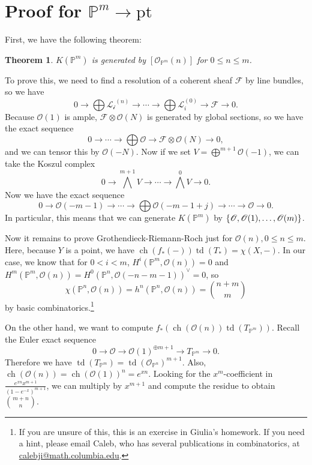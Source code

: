 \documentclass[leqno, openany]{memoir}
\newtheorem{thm}{Theorem}[section]
\theoremstyle{definition}
\theoremstyle{remark}
\theoremstyle{plain}
\theoremstyle{definition}
\theoremstyle{remark}
\renewcommand{\P}{\mathbb{P}}
\newcommand{\msc}[1]{\mathscr{#1}}
\newcommand{\mr}[1]{\mathrm{#1}}
\DeclareMathOperator{\ch}{ch}
\DeclareMathOperator{\td}{td}
\begin{document}
\section{Proof for $\P^m \to \mr{pt}$}%
\label{sec:proof_for_p_m_to_pt_}

First, we have the following theorem:
\begin{thm}
    $K(\P^m)$ is generated by $[\msc{O}_{\P^m}(n)]$ for $0 \leq n \leq m$.
\end{thm}

To prove this, we need to find a resolution of a coherent sheaf $\msc{F}$ by line bundles, so we have
\[ 0 \to \bigoplus \msc{L_i}^{(n)} \to \cdots \to \bigoplus \msc{L}_i^{(0)} \to \msc{F} \to 0. \]
Because $\msc{O}(1)$ is ample, $\msc{F} \otimes \msc{O}(N)$ is generated by global sections, so we have the exact sequence
\[ 0 \to \cdots \to \bigoplus \msc{O} \to \msc{F} \otimes \msc{O}(N) \to 0, \]
and we can tensor this by $\msc{O}(-N)$. Now if we set $V = \bigoplus^{m+1} \msc{O}(-1)$, we can take the Koszul complex
\[ 0 \to {\bigwedge}^{m+1} V \to \cdots \to {\bigwedge}^0 V \to 0. \]
Now we have the exact sequence
\[ 0 \to \msc{O}(-m-1) \to \cdots \to \bigoplus \msc{O}(-m-1+j) \to \cdots \to \msc{O} \to 0. \]
In particular, this means that we can generate $K(\P^m)$ by $\qty{\msc{O}, \msc{O}(1), \ldots, \msc{O}(m)}$.

Now it remains to prove Grothendieck-Riemann-Roch just for $\msc{O}(n), 0 \leq n \leq m$. Here, because $Y$ is a point, we have $\ch(f_*(-)) \td(T_*) = \chi(X, -)$. In our case, we know that for $0 < i < m$, $H^i(\P^m, \msc{O}(n)) = 0$ and $H^m(\P^m, \msc{O}(n)) = {H^0(\P^n, \msc{O}(-n-m-1))}^{\vee} = 0$, so
\[ \chi(\P^n, \msc{O}(n)) = h^n(\P^n, \msc{O}(n)) = \binom{n+m}{m} \]
by basic combinatorics.\footnote{If you are unsure of this, this is an exercise in Giulia's homework. If you need a hint, please email Caleb, who has several publications in combinatorics, at \url{calebji@math.columbia.edu}.}

On the other hand, we want to compute $f_*(\ch(\msc{O}(n)) \td(T_{\P^m}))$. Recall the Euler exact sequence
\[ 0 \to \msc{O} \to {\msc{O}(1)}^{\oplus m+1} \to T_{\P^m} \to 0. \]
Therefore we have $\td(T_{ \P^m }) = { \td(\msc{O}_{\P^n}) }^{m+1}$. Also, $\ch(\msc{O}(n)) = { \ch(\msc{O}(1)) }^n = e^{xn}$. Looking for the $x^m$-coefficient in $\frac{e^{xn} x^{m+1}}{{(1-e^{-x})}^{m+1}}$, we can multiply by $x^{m+1}$ and compute the residue to obtain $\binom{m+n}{n}$.
\end{document}
